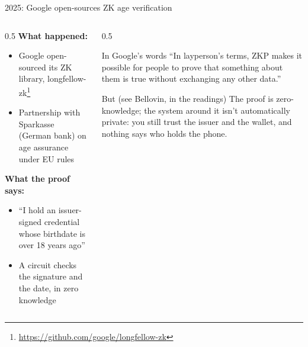 \ifdefined\PRESENTATION\else\PassOptionsToClass{handout}{beamer}\fi\documentclass[aspectratio=169, lualatex]{beamer}
\begin{document}
\begin{frame}{2025: Google open-sources ZK age verification}
	\begin{columns}[c]
		\begin{column}{0.5\textwidth}
			\textbf{What happened:}
			\begin{itemize}
				\item Google open-sourced its ZK library, longfellow-zk\footnote{\url{https://github.com/google/longfellow-zk}}
				\item Partnership with Sparkasse (German bank) on age assurance under EU rules
			\end{itemize}
			\textbf{What the proof says:}
			\begin{itemize}
				\item ``I hold an issuer-signed credential whose birthdate is over 18 years ago''
				\item A circuit checks the signature and the date, in zero knowledge
			\end{itemize}
		\end{column}
		\begin{column}{0.5\textwidth}
			\begin{exampleblock}{In Google's words}
				``In layperson's terms, ZKP makes it possible for people to prove that something about them is true without exchanging any other data.''
			\end{exampleblock}
			\begin{alertblock}{But (see Bellovin, in the readings)}
				The proof is zero-knowledge; the system around it isn't automatically private: you still trust the issuer and the wallet, and nothing says who holds the phone.
			\end{alertblock}
		\end{column}
	\end{columns}
\end{frame}
\end{document}
